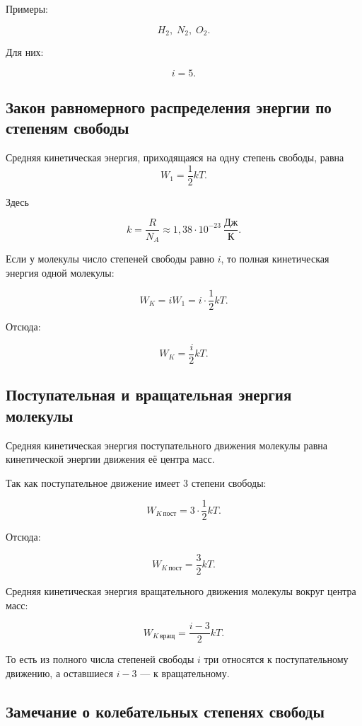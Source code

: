 \documentclass[a4paper,12pt]{article}
\begin{document}
Примеры:

\[
H_2,\; N_2,\; O_2.
\]

Для них:

\[
i=5.
\]

\subsection*{Закон равномерного распределения энергии по степеням свободы}

\begin{theorembox}
Средняя кинетическая энергия, приходящаяся на одну степень свободы, равна
\[
W_1=\frac{1}{2}kT.
\]
\end{theorembox}

Здесь

\[
k=\frac{R}{N_A}\approx1{,}38\cdot10^{-23}\ \frac{\text{Дж}}{\text{К}}.
\]

Если у молекулы число степеней свободы равно $i$, то полная кинетическая энергия одной молекулы:

\[
W_K=iW_1=i\cdot \frac{1}{2}kT.
\]

Отсюда:

\[
W_K=\frac{i}{2}kT.
\]

\subsection*{Поступательная и вращательная энергия молекулы}

Средняя кинетическая энергия поступательного движения молекулы равна кинетической энергии движения её центра масс.

Так как поступательное движение имеет $3$ степени свободы:

\[
W_{K\,\text{пост}}=3\cdot \frac{1}{2}kT.
\]

Отсюда:

\[
W_{K\,\text{пост}}=\frac{3}{2}kT.
\]

Средняя кинетическая энергия вращательного движения молекулы вокруг центра масс:

\[
W_{K\,\text{вращ}}=\frac{i-3}{2}kT.
\]

То есть из полного числа степеней свободы $i$ три относятся к поступательному движению, а оставшиеся $i-3$ — к вращательному.

\subsection*{Замечание о колебательных степенях свободы}
\end{document}
